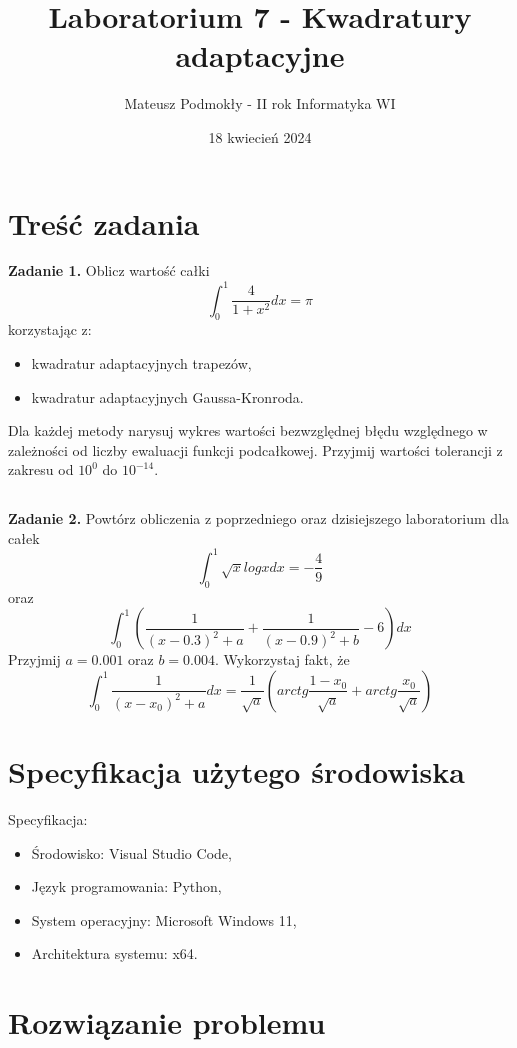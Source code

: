 \documentclass[11pt]{scrartcl}
\title{Laboratorium 7 - Kwadratury adaptacyjne}
\author{Mateusz Podmokły - II rok Informatyka WI}
\date{18 kwiecień 2024}
\begin{document}
    \maketitle
    \section{Treść zadania}
    \textbf{Zadanie 1.} Oblicz wartość całki
    \[
        \int_{0}^{1}\frac{4}{1+x^2}dx=\pi
    \]
    korzystając z:
    \begin{itemize}
        \item kwadratur adaptacyjnych trapezów,
        \item kwadratur adaptacyjnych Gaussa-Kronroda.
    \end{itemize}
    Dla każdej metody narysuj wykres wartości bezwzględnej
    błędu względnego w zależności od liczby ewaluacji funkcji
    podcałkowej. Przyjmij wartości tolerancji z zakresu od
    $10^0$ do $10^{-14}$.

    \subsection*{}
    \textbf{Zadanie 2.} Powtórz obliczenia z poprzedniego oraz
    dzisiejszego laboratorium dla całek
    \[
        \int_{0}^{1}\sqrt{x}logxdx=-\frac{4}{9}
    \]
    oraz
    \[
        \int_{0}^{1}\left( \frac{1}{(x-0.3)^2+a} + \frac{1}
            {(x-0.9)^2+b} - 6 \right)dx
    \]
    Przyjmij $a=0.001$ oraz $b=0.004$. Wykorzystaj fakt, że
    \[
        \int_{0}^{1}\frac{1}{(x-x_0)^2+a}dx=\frac{1}{\sqrt{a}}
            \left( arctg \frac{1-x_0}{\sqrt{a}} + arctg
            \frac{x_0}{\sqrt{a}} \right)
    \]

    \section{Specyfikacja użytego środowiska}
    Specyfikacja:

    \begin{itemize}
        \item Środowisko: Visual Studio Code,
        \item Język programowania: Python,
        \item System operacyjny: Microsoft Windows 11,
        \item Architektura systemu: x64.
    \end{itemize}

    \section{Rozwiązanie problemu}
\end{document}
